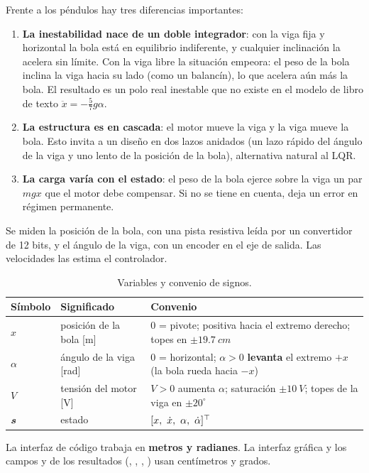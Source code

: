 Frente a los péndulos hay tres diferencias importantes:
\begin{enumerate}
  \item \textbf{La inestabilidad nace de un doble integrador}: con la viga fija y horizontal la bola está en equilibrio indiferente, y cualquier inclinación la acelera sin límite. Con la viga libre la situación empeora: el peso de la bola inclina la viga hacia su lado (como un balancín), lo que acelera aún más la bola. El resultado es un polo real inestable que no existe en el modelo de libro de texto $\ddot x=-\tfrac57g\alpha$.
  \item \textbf{La estructura es en cascada}: el motor mueve la viga y la viga mueve la bola. Esto invita a un diseño en dos lazos anidados (un lazo rápido del ángulo de la viga y uno lento de la posición de la bola), alternativa natural al LQR.
  \item \textbf{La carga varía con el estado}: el peso de la bola ejerce sobre la viga un par $m g x$ que el motor debe compensar. Si no se tiene en cuenta, deja un error en régimen permanente.
\end{enumerate}

Se miden la posición de la bola, con una pista resistiva leída por un convertidor de 12 bits, y el ángulo de la viga, con un encoder en el eje de salida. Las velocidades las estima el controlador.

\begin{table}[H]
\centering\small
\begin{tabular}{@{}lll@{}}
\toprule
Símbolo & Significado & Convenio\\
\midrule
$x$ & posición de la bola [m] & $0$ = pivote; positiva hacia el extremo derecho; topes en $\pm\SI{19.7}{cm}$\\
$\alpha$ & ángulo de la viga [rad] & $0$ = horizontal; $\alpha>0$ \textbf{levanta} el extremo $+x$ (la bola rueda hacia $-x$)\\
$V$ & tensión del motor [V] & $V>0$ aumenta $\alpha$; saturación $\pm\SI{10}{V}$; topes de la viga en $\pm20^\circ$\\
$\bm{s}$ & estado & $[x,\ \xd,\ \alpha,\ \ald]^\top$\\
\bottomrule
\end{tabular}
\caption{Variables y convenio de signos.}
\label{tab:convenio}
\end{table}

\begin{nota}
La interfaz de código trabaja en \textbf{metros y radianes}. La interfaz gráfica y los campos  y  de los resultados (, , , ) usan centímetros y grados.
\end{nota}


